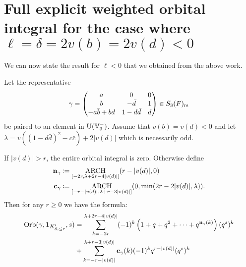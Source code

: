 \section{Full explicit weighted orbital integral for the case where $\ell = \delta = 2v(b) = 2v(d) < 0$}
We can now state the result for $\ell < 0$ that we obtained from the above work.
\begin{theorem}
  \label{thm:full_orbital_ell_neg}
  Let the representative
  \[ \gamma = \begin{pmatrix}
      a & 0 & 0 \\
      b & - \bar d & 1 \\
      -a \bar b + b d & 1 - d \bar d & d
    \end{pmatrix} \in S_3(F)_{\mathrm{rs}} \]
  be paired to an element in $\operatorname{U}(\mathbb V_3^-)$.
  Assume that $v(b) = v(d) < 0$ and let
  $\lambda = v((1 - d \bar d)^2 - c \bar c) + 2|v(d)|$
  which is necessarily odd.

  If $|v(d)| > r$, the entire orbital integral is zero.
  Otherwise define
  \begin{align*}
    \mathbf n_\gamma &\coloneqq \operatorname*{ARCH}_{[-2r, \lambda+2r-4|v(d)|]}(r-|v(d)|, 0) \\
    \mathbf c_\gamma &\coloneqq \operatorname*{ARCH}_{[-r-|v(d)|, \lambda+r-3|v(d)|]} (0, \min(2r-2|v(d)|, \lambda)).
  \end{align*}
  Then for any $r \ge 0$ we have the formula:
  \begin{align*}
    \operatorname{Orb}(\gamma, \mathbf{1}_{K'_{S, \le r}}, s)
    &= \sum_{k = -2r}^{\lambda + 2r-4|v(d)|}
    (-1)^k \left( 1 + q + q^2 + \dots + q^{\mathbf n_{\gamma}(k)} \right) (q^s)^k \\
    &+ \sum_{k = -r-|v(d)|}^{\lambda+r-3|v(d)|} \mathbf c_\gamma(k) (-1)^k q^{r-|v(d)|} (q^s)^k \\
  \end{align*}
\end{theorem}
